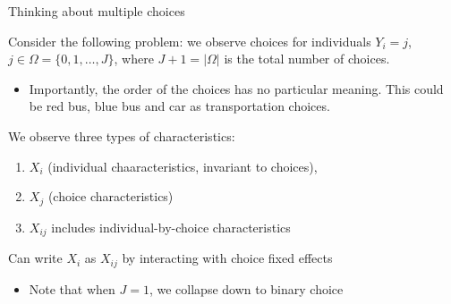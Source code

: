 \documentclass[notes,11pt, aspectratio=169]{beamer}
\newenvironment{wideitemize}{\itemize\addtolength{\itemsep}{10pt}}{\enditemize}
\begin{document}
\begin{frame}{Thinking about multiple choices}
  \begin{wideitemize}
  \item   Consider the following problem: we observe choices for individuals
    $Y_{i} = j$, $j \in \Omega = \{0, 1, \ldots, J\}$, where
    $J+1 = |\Omega|$ is the total number of choices.
    \begin{itemize}
    \item Importantly, the order of the choices has no particular
      meaning. This could be red bus, blue bus and car as
      transportation choices.
    \end{itemize}
  \item We observe three types of characteristics:
    \begin{enumerate}
    \item $X_{i}$ (individual chaaracteristics, invariant to choices),
    \item       $X_{j}$ (choice characteristics) 
    \item  $X_{ij}$ includes individual-by-choice characteristics
    \end{enumerate}
  \item Can write $X_{i}$ as $X_{ij}$ by interacting with choice
      fixed effects
    \begin{itemize}
  \item Note that when $J = 1$, we collapse down to binary choice
    \end{itemize}
  \end{wideitemize}
\end{frame}
\end{document}
